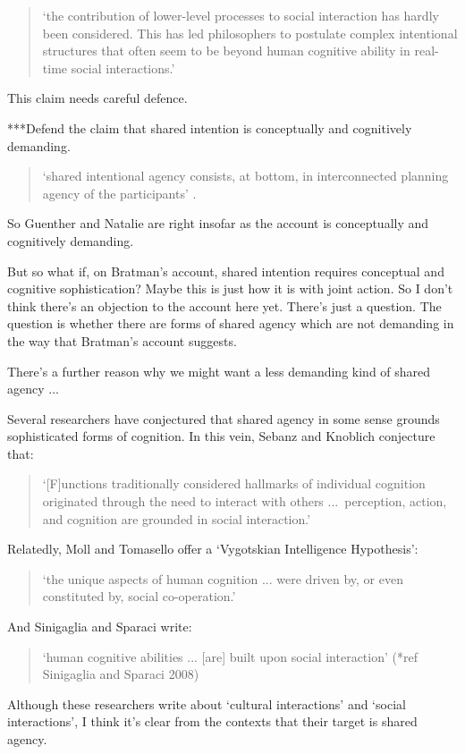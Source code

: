 \documentclass[12pt,\papersize]{extarticle}
\begin{document}
\begin{quote}
`the contribution of lower-level processes to social interaction has hardly been considered. This has led philosophers to postulate complex intentional structures that often seem to be beyond human cognitive ability in real-time social interactions.'
\citep[p.\ 2022]{Knoblich:2008hy}
\end{quote}
%
This claim needs careful defence.

***Defend the claim that shared intention is conceptually and cognitively demanding.

\begin{quote}
`shared intentional agency consists, at bottom, in interconnected planning agency of the participants' \citep[p.\ 11]{Bratman:2011fk}.
\end{quote}
%
So Guenther and Natalie are right insofar as the account is conceptually and cognitively demanding.

But so what if, on Bratman’s account, shared intention requires conceptual and cognitive sophistication?
Maybe this is just how it is with joint action.
So I don’t think there’s an objection to the account here yet.
There’s just a question.
The question is whether there are forms of shared agency which are not demanding in the way that Bratman’s account suggests.

There's a further reason why we might want a less demanding kind of shared agency ... 

Several researchers have conjectured that shared agency in some sense grounds sophisticated forms of cognition.
In this vein, Sebanz and Knoblich conjecture that:
%
\begin{quote}
`[F]unctions traditionally considered hallmarks of individual cognition originated through the need to interact with others ...\
perception, action, and cognition are grounded in social interaction.' \citep[p.\ 103]{Knoblich:2006bn}
\end{quote}
%
Relatedly, Moll and Tomasello offer a `Vygotskian Intelligence Hypothesis':
\begin{quote}
`the unique aspects of human cognition ... were driven by, or even constituted by, social co-operation.' \citep[p.\ 1]{Moll:2007gu}
\end{quote}
%
And Sinigaglia and Sparaci write:
\begin{quote}
`human cognitive abilities ... [are] built upon social interaction' 
(*ref Sinigaglia and Sparaci 2008)
\end{quote}
%
Although these researchers write about `cultural interactions' and `social interactions', I think it's clear from the contexts that their target is shared agency.
\end{document}
